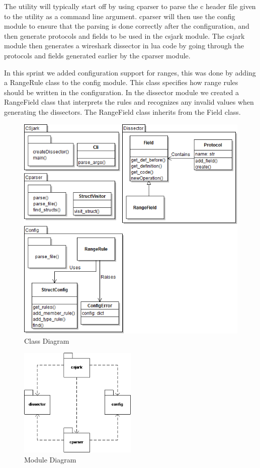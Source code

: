 The \gls{utility} will typically start off by using cparser to parse the \Gls{c} \gls{header} file given to
the \gls{utility} as a command line argument. cparser will then use the config module
to ensure that the parsing is done correctly after the configuration, and then
generate protocols and fields to be used in the csjark module. The csjark
module then generates a \Gls{wireshark} \gls{dissector} in \Gls{lua} code by going through the
protocols and fields generated earlier by the cparser module.

In this sprint we added configuration support for ranges, this was done 
by adding a RangeRule class to the config module. This class specifies how
range rules should be written in the configuration. In the \gls{dissector} module
we created a RangeField class that interprets the rules
and recognizes any invalid values when generating the \glspl{dissector}.
The RangeField class inherits from the Field class.

\begin{figure}[!htb]
	\center
	\includegraphics[width=\textwidth]{./sprints/img/ClassDiagramSprint1v2}
	\caption{Class Diagram\label{fig:sp1_class}}
\end{figure}

\begin{figure}[!htb]
	\center
	\includegraphics[width=0.50\textwidth]{./sprints/img/sp1modulediagram}
	\caption{Module Diagram\label{fig:sp1_module}}
\end{figure}


